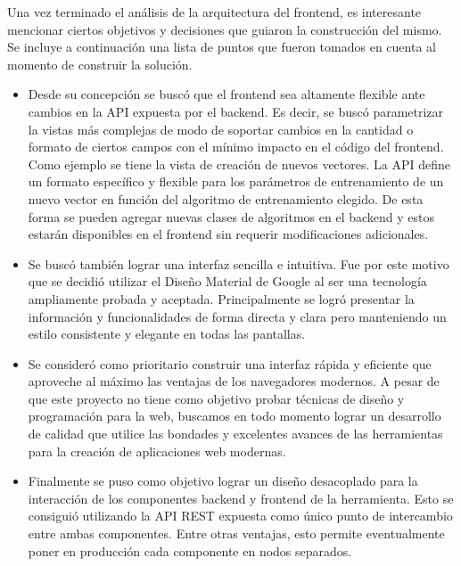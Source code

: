 Una vez terminado el análisis de la arquitectura del frontend, es interesante mencionar ciertos objetivos y
decisiones que guiaron la construcción del mismo. Se incluye a continuación una lista de puntos que fueron
tomados en cuenta al momento de construir la solución.

\begin{itemize}

\item Desde su concepción se buscó que el frontend sea altamente flexible ante cambios en la API expuesta
por el backend. Es decir, se buscó parametrizar la vistas más complejas de modo de soportar cambios en la
cantidad o formato de ciertos campos con el mínimo impacto en el código del frontend. Como ejemplo se tiene
la vista de creación de nuevos vectores. La API define un formato específico y flexible para los parámetros
de entrenamiento de un nuevo vector en función del algoritmo de entrenamiento elegido. De esta forma se
pueden agregar nuevas clases de algoritmos en el backend y estos estarán disponibles en el frontend sin
requerir modificaciones adicionales.

\item Se buscó también lograr una interfaz sencilla e intuitiva. Fue por este motivo que se decidió
utilizar el Diseño Material de Google al ser una tecnología ampliamente probada y aceptada. Principalmente
se logró presentar la información y funcionalidades de forma directa y clara pero manteniendo un estilo
consistente y elegante en todas las pantallas.

\item Se consideró como prioritario construir una interfaz rápida y eficiente que aproveche al máximo las
ventajas de los navegadores modernos. A pesar de que este proyecto no tiene como objetivo probar técnicas
de diseño y programación para la web, buscamos en todo momento lograr un desarrollo de calidad que utilice
las bondades y excelentes avances de las herramientas para la creación de aplicaciones web modernas.

\item Finalmente se puso como objetivo lograr un diseño desacoplado para la interacción de los componentes
backend y frontend de la herramienta. Esto se consiguió utilizando la API REST expuesta como único punto de
intercambio entre ambas componentes. Entre otras ventajas, esto permite eventualmente poner en producción
cada componente en nodos separados.

\end{itemize}
